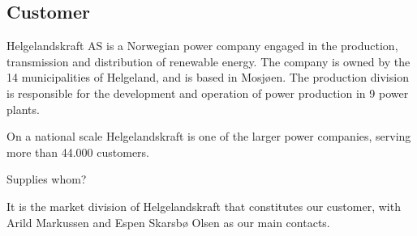\subsection{Customer}
Helgelandskraft AS is a Norwegian power company engaged in the production,
transmission and distribution of renewable energy. The company is owned by
the 14 municipalities of Helgeland, and is based in Mosjøen. The production
division is responsible for the development and operation of power production
in 9 power plants.

On a national scale Helgelandskraft is one of the larger power companies,
serving more than 44.000 customers.

Supplies whom?

It is the market division of Helgelandskraft that constitutes our customer,
with Arild Markussen and Espen Skarsbø Olsen as our main contacts.
